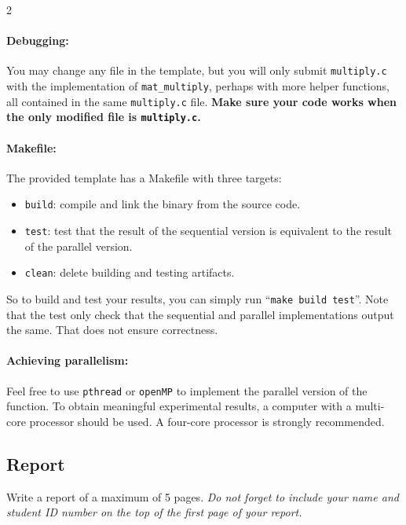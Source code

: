 \documentclass[12pt]{article}
\begin{document}
\begin{multicols}{2}

\paragraph{Debugging:} You may change any file in the template, but you will only submit \texttt{multiply.c} with the implementation of \texttt{mat\_multiply}, perhaps with more helper functions, all contained in the same \texttt{multiply.c} file. \textbf{Make sure your code works when the only modified file is \texttt{multiply.c}.} 

\paragraph{Makefile:} The provided template has a Makefile with three targets:
\begin{itemize}
  \item \texttt{build}: compile and link the binary from the source code.
  \item \texttt{test}: test that the result of the sequential version is equivalent to the result of the parallel version.
  \item \texttt{clean}: delete building and testing artifacts.
\end{itemize}

So to build and test your results, you can simply run ``\texttt{make build test}''. Note that the test only check that the sequential and parallel implementations output the same. That does not ensure correctness.

\paragraph{Achieving parallelism:} Feel free to use \texttt{pthread} or \texttt{openMP} to implement the parallel version of the function. To obtain meaningful experimental results, a computer with a multi-core processor should be used. A four-core processor is strongly recommended.


\subsection*{Report}
Write a report of a maximum of 5 pages. {\em Do not forget to include your name and student ID number on the top of the first page of your report.}


\end{multicols}
\end{document}
